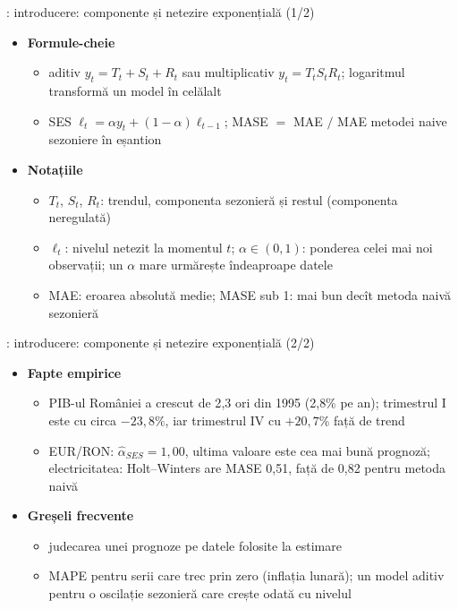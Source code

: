 \begin{frame}{: introducere: componente și netezire exponențială (1/2)}
\itemsize{\footnotesize}
\begin{itemize}
    \item \textbf{Formule-cheie}
    \begin{itemize}
        \item aditiv $y_t = T_t + S_t + R_t$ sau multiplicativ $y_t = T_t S_t R_t$; logaritmul transformă un model în celălalt
        \item SES $\ell_t = \alpha y_t + (1 - \alpha)\ell_{t-1}$; MASE $=$ MAE $/$ MAE metodei naive sezoniere în eșantion
    \end{itemize}
    \item \textbf{Notațiile}
    \begin{itemize}
        \item $T_t$, $S_t$, $R_t$: trendul, componenta sezonieră și restul (componenta neregulată)
        \item $\ell_t$: nivelul netezit la momentul $t$; $\alpha \in (0, 1)$: ponderea celei mai noi observații; un $\alpha$ mare urmărește îndeaproape datele
        \item MAE: eroarea absolută medie; MASE sub 1: mai bun decît metoda naivă sezonieră
    \end{itemize}
\end{itemize}
\end{frame}

\begin{frame}{: introducere: componente și netezire exponențială (2/2)}
\itemsize{\footnotesize}
\begin{itemize}
    \item \textbf{Fapte empirice}
    \begin{itemize}
        \item PIB-ul României a crescut de 2{,}3 ori din 1995 (2{,}8\% pe an); trimestrul I este cu circa $\ensuremath{-}23{,}8\%$, iar trimestrul IV cu $+20{,}7\%$ față de trend
        \item EUR/RON: $\hat\alpha_{SES} = 1{,}00$, ultima valoare este cea mai bună prognoză; electricitatea: Holt--Winters are MASE 0{,}51, față de 0{,}82 pentru metoda naivă
    \end{itemize}
    \item \textbf{Greșeli frecvente}
    \begin{itemize}
        \item judecarea unei prognoze pe datele folosite la estimare
        \item MAPE pentru serii care trec prin zero (inflația lunară); un model aditiv pentru o oscilație sezonieră care crește odată cu nivelul
    \end{itemize}
\end{itemize}
\end{frame}

